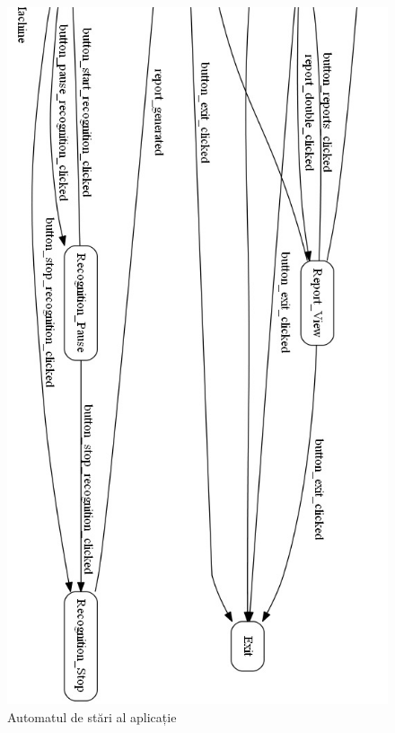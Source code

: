 \documentclass[a4paper, 12pt]{report}
\begin{document}
	\begin{figure}[H]\ContinuedFloat
		\vfill
		\begin{center}
			\includegraphics[width=\textwidth,height=\textheight,keepaspectratio]{images/state_diagram_002.jpg}
		\end{center}
		\vfill
		\caption{Automatul de stări al aplicație}
		\label{fig:state}
	\end{figure} 	 	
\end{document}
